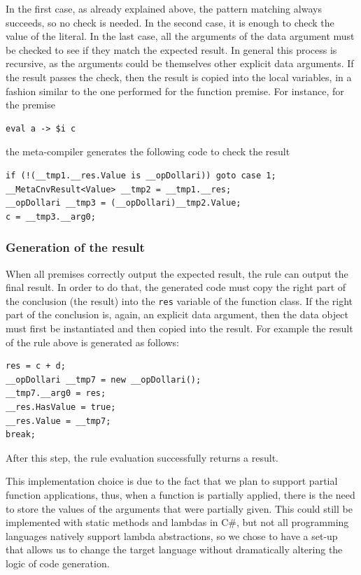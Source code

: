In the first case, as already explained above, the pattern matching always succeeds, so no check is needed. In the second case, it is enough to check the value of the literal. In the last case, all the arguments of the data argument must be checked to see if they match the expected result. In general this process is recursive, as the arguments could be themselves other explicit data arguments. If the result passes the check, then the result is copied into the local variables, in a fashion similar to the one performed for the function premise. For instance, for the premise

\begin{lstlisting}
eval a -> $i c
\end{lstlisting}

\noindent
the meta-compiler generates the following code to check the result
\begin{lstlisting}
if (!(__tmp1.__res.Value is __opDollari)) goto case 1;
__MetaCnvResult<Value> __tmp2 = __tmp1.__res;
__opDollari __tmp3 = (__opDollari)__tmp2.Value;
c = __tmp3.__arg0;
\end{lstlisting}

\subsubsection{Generation of the result}
When all premises correctly output the expected result, the rule can output the final result. In order to do that, the generated code must copy the right part of the conclusion (the result) into the \texttt{res} variable of the function class. If the right part of the conclusion is, again, an explicit data argument, then the data object must first be instantiated and then copied into the result. For example the result of the rule above is generated as follows:

\begin{lstlisting}
res = c + d;
__opDollari __tmp7 = new __opDollari();
__tmp7.__arg0 = res;
__res.HasValue = true;
__res.Value = __tmp7;
break;
\end{lstlisting}

\noindent
After this step, the rule evaluation successfully returns a result.

This implementation choice is due to the fact that we plan to support partial function applications, thus, when a function is partially applied, there is the need to store the values of the arguments that were partially given. This could still be implemented with static methods and lambdas in C\#, but not all programming languages natively support lambda abstractions, so we chose to have a set-up that allows us to change the target language without dramatically altering the logic of code generation.

